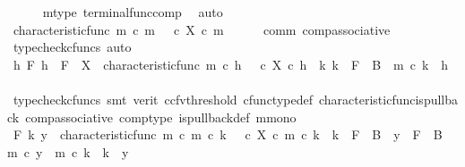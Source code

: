 \begin{isabellebody}
\ \ \ \ \isamarkupfalse%
\ m{\isacharunderscore}{\kern0pt}type\ terminal{\isacharunderscore}{\kern0pt}func{\isacharunderscore}{\kern0pt}comp\ \isamarkupfalse%
\ auto\isanewline
\ \ \isamarkupfalse%
\ \isamarkupfalse%
\ {\isachardoublequoteopen}characteristic{\isacharunderscore}{\kern0pt}func\ m\ {\isasymcirc}\isactrlsub c\ m\ {\isacharequal}{\kern0pt}\ {\isacharparenleft}{\kern0pt}{\isasymt}\ {\isasymcirc}\isactrlsub c\ {\isasymbeta}\isactrlbsub X\isactrlesub {\isacharparenright}{\kern0pt}\ {\isasymcirc}\isactrlsub c\ m{\isachardoublequoteclose}\isanewline
\ \ \ \ \isamarkupfalse%
\ comm\ comp{\isacharunderscore}{\kern0pt}associative{}\ \isamarkupfalse%
\ {\isacharparenleft}{\kern0pt}typecheck{\isacharunderscore}{\kern0pt}cfuncs{\isacharcomma}{\kern0pt}\ auto{\isacharparenright}{\kern0pt}\isanewline
{}\isamarkupfalse%
\isanewline
\ \ \isamarkupfalse%
\ {\isachardoublequoteopen}{\isasymAnd}h\ F{\isachardot}{\kern0pt}\ h\ {\isacharcolon}{\kern0pt}\ F\ {\isasymrightarrow}\ X\ {\isasymLongrightarrow}\ characteristic{\isacharunderscore}{\kern0pt}func\ m\ {\isasymcirc}\isactrlsub c\ h\ {\isacharequal}{\kern0pt}\ {\isacharparenleft}{\kern0pt}{\isasymt}\ {\isasymcirc}\isactrlsub c\ {\isasymbeta}\isactrlbsub X\isactrlesub {\isacharparenright}{\kern0pt}\ {\isasymcirc}\isactrlsub c\ h\ {\isasymLongrightarrow}\ {\isasymexists}k{\isachardot}{\kern0pt}\ k\ {\isacharcolon}{\kern0pt}\ F\ {\isasymrightarrow}\ B\ {\isasymand}\ m\ {\isasymcirc}\isactrlsub c\ k\ {\isacharequal}{\kern0pt}\ h{\isachardoublequoteclose}\isanewline
\ \ \ \ \isamarkupfalse%
\ {\isacharparenleft}{\kern0pt}typecheck{\isacharunderscore}{\kern0pt}cfuncs{\isacharcomma}{\kern0pt}\ smt\ {\isacharparenleft}{\kern0pt}verit{\isacharcomma}{\kern0pt}\ ccfv{\isacharunderscore}{\kern0pt}threshold{\isacharparenright}{\kern0pt}\ cfunc{\isacharunderscore}{\kern0pt}type{\isacharunderscore}{\kern0pt}def\ characteristic{\isacharunderscore}{\kern0pt}func{\isacharunderscore}{\kern0pt}is{\isacharunderscore}{\kern0pt}pullback\ comp{\isacharunderscore}{\kern0pt}associative\ comp{\isacharunderscore}{\kern0pt}type\ is{\isacharunderscore}{\kern0pt}pullback{\isacharunderscore}{\kern0pt}def\ m{\isacharunderscore}{\kern0pt}mono{\isacharparenright}{\kern0pt}\isanewline
{}\isamarkupfalse%
\isanewline
\ \ \isamarkupfalse%
\ {\isachardoublequoteopen}{\isasymAnd}F\ k\ y{\isachardot}{\kern0pt}\ \ characteristic{\isacharunderscore}{\kern0pt}func\ m\ {\isasymcirc}\isactrlsub c\ m\ {\isasymcirc}\isactrlsub c\ k\ {\isacharequal}{\kern0pt}\ {\isacharparenleft}{\kern0pt}{\isasymt}\ {\isasymcirc}\isactrlsub c\ {\isasymbeta}\isactrlbsub X\isactrlesub {\isacharparenright}{\kern0pt}\ {\isasymcirc}\isactrlsub c\ m\ {\isasymcirc}\isactrlsub c\ k\ {\isasymLongrightarrow}\ k\ {\isacharcolon}{\kern0pt}\ F\ {\isasymrightarrow}\ B\ {\isasymLongrightarrow}\ y\ {\isacharcolon}{\kern0pt}\ F\ {\isasymrightarrow}\ B\ {\isasymLongrightarrow}\ m\ {\isasymcirc}\isactrlsub c\ y\ {\isacharequal}{\kern0pt}\ m\ {\isasymcirc}\isactrlsub c\ k\ {\isasymLongrightarrow}\ k\ {\isacharequal}{\kern0pt}\ y{\isachardoublequoteclose}\isanewline

\end{isabellebody}
